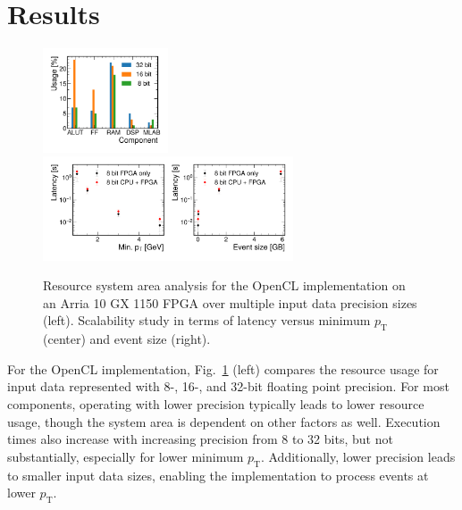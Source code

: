 \documentclass{article}
\newcommand{\pt}{\ensuremath{p_{\mathrm{T}}}\xspace}
\begin{document}
\section{Results}
\label{sec:results}

\begin{figure}[htpb]
    \centering
    \includegraphics[width=0.33\textwidth]{figures/resource_bit_precision_ocl.pdf}
    \includegraphics[width=0.66\textwidth]{figures/scalability_study.pdf}
    \caption{Resource system area analysis for the OpenCL implementation on an Arria 10 GX 1150 FPGA over multiple input data precision sizes (left). 
    Scalability study in terms of latency versus minimum $\pt$ (center) and event size (right).}
    \label{fig:ocl_precision_scalability}
\end{figure}

For the OpenCL implementation, Fig.~\ref{fig:ocl_precision_scalability} (left) compares the resource usage for input data represented with 8-, 16-, and 32-bit floating point precision.
For most components, operating with lower precision typically leads to lower resource usage, though the system area is dependent on other factors as well.
Execution times also increase with increasing precision from 8 to 32 bits, but not substantially, especially for lower minimum $\pt$.
Additionally, lower precision leads to smaller input data sizes, enabling the implementation to process events at lower $\pt$.
\end{document}
